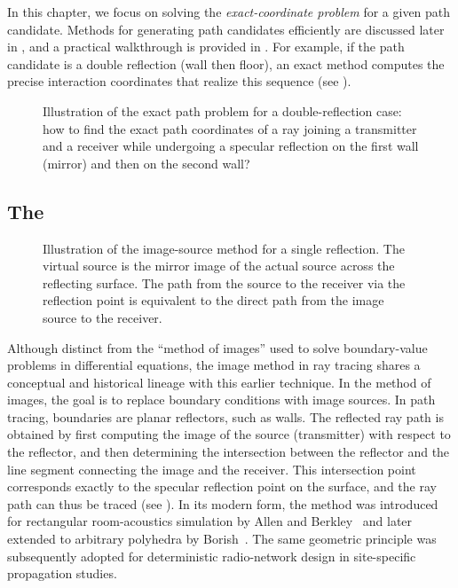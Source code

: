 In this chapter, we focus on solving the \emph{exact-coordinate problem} for a given path candidate. Methods for generating path candidates efficiently are discussed later in , and a practical walkthrough is provided in . For example, if the path candidate is a double reflection (wall then floor), an exact method computes the precise interaction coordinates that realize this sequence (see ).

\begin{figure}
  \caption{Illustration of the exact path problem for a double-reflection case: how to find the exact path coordinates of a ray joining a transmitter and a receiver while undergoing a specular reflection on the first wall (mirror) and then on the second wall?}
\end{figure}

\subsection{The \texorpdfstring{}{Image Method}}

\begin{figure}
  \caption{Illustration of the image-source method for a single reflection. The virtual source is the mirror image of the actual source across the reflecting surface. The path from the source to the receiver via the reflection point is equivalent to the direct path from the image source to the receiver.}
\end{figure}

Although distinct from the \enquote{method of images} used to solve boundary-value problems in differential equations, the image method in ray tracing shares a conceptual and historical lineage with this earlier technique. In the method of images, the goal is to replace boundary conditions with image sources. In path tracing, boundaries are planar reflectors, such as walls. The reflected ray path is obtained by first computing the image of the source (transmitter) with respect to the reflector, and then determining the intersection between the reflector and the line segment connecting the image and the receiver. This intersection point corresponds exactly to the specular reflection point on the surface, and the ray path can thus be traced (see ). In its modern form, the method was introduced for rectangular room-acoustics simulation by Allen and Berkley~ and later extended to arbitrary polyhedra by Borish~. The same geometric principle was subsequently adopted for deterministic radio-network design in site-specific propagation studies.

